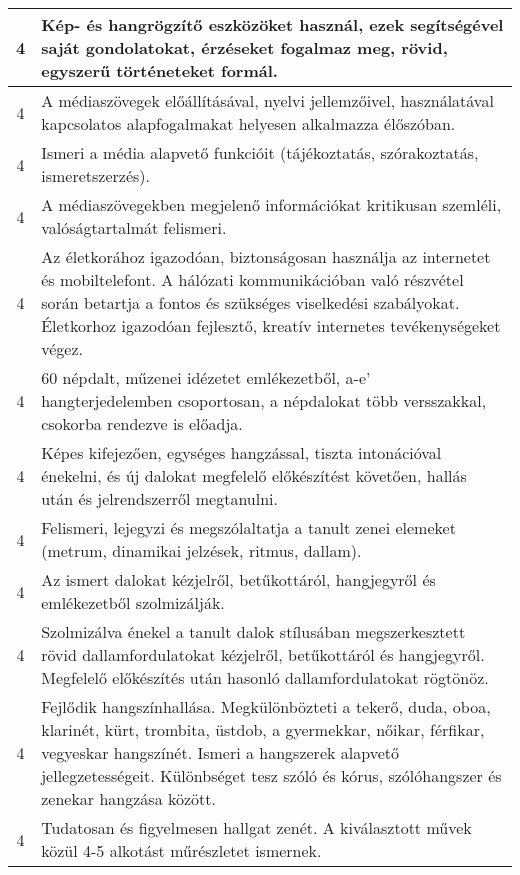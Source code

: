 \begin{longtable}{c | p{12cm} }
                                          4 &  Kép- és hangrögzítő eszközöket használ, ezek segítségével saját gondolatokat, érzéseket fogalmaz meg, rövid, egyszerű történeteket formál. \\ \hline
                                          4 &  A médiaszövegek előállításával, nyelvi jellemzőivel, használatával kapcsolatos alapfogalmakat  helyesen alkalmazza élőszóban. \\ \hline
                                          4 &  Ismeri a média alapvető funkcióit (tájékoztatás, szórakoztatás, ismeretszerzés). \\ \hline
                                          4 &  A médiaszövegekben megjelenő információkat kritikusan szemléli,  valóságtartalmát felismeri. \\ \hline
                                          4 &  Az életkorához igazodóan,  biztonságosan használja az internetet és mobiltelefont.  A hálózati kommunikációban való részvétel során betartja a fontos és szükséges viselkedési szabályokat. Életkorhoz igazodóan fejlesztő, kreatív internetes tevékenységeket végez. \\ \hline
                                          4 &  60 népdalt, műzenei idézetet emlékezetből, a-e’ hangterjedelemben csoportosan, a népdalokat több versszakkal, csokorba rendezve is előadja. \\ \hline
                                          4 &  Képes kifejezően, egységes hangzással, tiszta intonációval énekelni, és új dalokat megfelelő előkészítést követően, hallás után és jelrendszerről megtanulni. \\ \hline
                                          4 &  Felismeri, lejegyzi és megszólaltatja a tanult zenei elemeket (metrum, dinamikai jelzések, ritmus, dallam). \\ \hline
                                          4 &  Az ismert dalokat kézjelről, betűkottáról, hangjegyről és emlékezetből szolmizálják. \\ \hline
                                          4 &  Szolmizálva énekel a tanult dalok stílusában megszerkesztett rövid dallamfordulatokat kézjelről, betűkottáról és hangjegyről. Megfelelő előkészítés után hasonló dallamfordulatokat rögtönöz. \\ \hline
                                          4 &  Fejlődik hangszínhallása. Megkülönbözteti a tekerő, duda, oboa, klarinét, kürt, trombita, üstdob, a gyermekkar, nőikar, férfikar, vegyeskar hangszínét. Ismeri a hangszerek alapvető jellegzetességeit. Különbséget tesz szóló és kórus, szólóhangszer és zenekar hangzása között. \\ \hline
                                          4 &  Tudatosan és figyelmesen hallgat zenét. A kiválasztott művek közül 4-5 alkotást műrészletet ismernek. \\ \hline
                                      
                        \end{longtable}
            \clearpage

